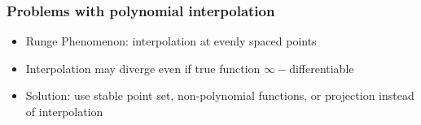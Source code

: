 \documentclass[bigger]{beamer}
\begin{document}
\begin{frame}%

\frametitle{Problems with polynomial interpolation}

\begin{itemize}

\item Runge Phenomenon: interpolation at evenly spaced points 
\item Interpolation may diverge even if true function $\infty-$differentiable
\item Solution: use stable point set, non-polynomial functions, or projection instead of interpolation
\end{itemize}


\end{frame}%
\end{document}
